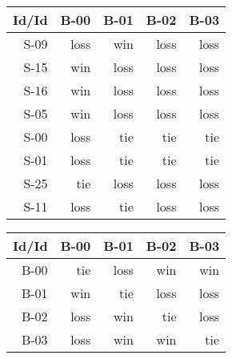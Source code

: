 \begin{tabular}{ | r | r | r | r | r | }
    \hline
        Id/Id  &   B-00  &   B-01  &   B-02  &   B-03  \\
    \hline
    \hline
         S-09  &   loss  &    win  &   loss  &   loss  \\
    \hline
         S-15  &    win  &   loss  &   loss  &   loss  \\
    \hline
         S-16  &    win  &   loss  &   loss  &   loss  \\
    \hline
         S-05  &    win  &   loss  &   loss  &   loss  \\
    \hline
         S-00  &   loss  &    tie  &    tie  &    tie  \\
    \hline
         S-01  &   loss  &    tie  &    tie  &    tie  \\
    \hline
         S-25  &    tie  &   loss  &   loss  &   loss  \\
    \hline
         S-11  &   loss  &    tie  &   loss  &   loss  \\
    \hline
\end{tabular}


\begin{tabular}{ | r | r | r | r | r | }
    \hline
        Id/Id  &   B-00  &   B-01  &   B-02  &   B-03  \\
    \hline
    \hline
         B-00  &    tie  &   loss  &    win  &    win  \\
    \hline
         B-01  &    win  &    tie  &   loss  &   loss  \\
    \hline
         B-02  &   loss  &    win  &    tie  &   loss  \\
    \hline
         B-03  &   loss  &    win  &    win  &    tie  \\
    \hline
\end{tabular}




